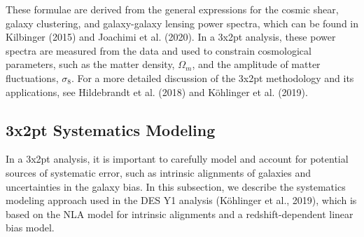 \documentclass[twocolumn]{aastex631}
\begin{document}
These formulae are derived from the general expressions for the cosmic shear, galaxy clustering, and galaxy-galaxy lensing power spectra, which can be found in Kilbinger (2015) and Joachimi et al. (2020). In a 3x2pt analysis, these power spectra are measured from the data and used to constrain cosmological parameters, such as the matter density, $\Omega_m$, and the amplitude of matter fluctuations, $\sigma_8$. For a more detailed discussion of the 3x2pt methodology and its applications, see Hildebrandt et al. (2018) and Köhlinger et al. (2019).

%
%

\subsection{3x2pt Systematics Modeling}

In a 3x2pt analysis, it is important to carefully model and account for potential sources of systematic error, such as intrinsic alignments of galaxies and uncertainties in the galaxy bias. In this subsection, we describe the systematics modeling approach used in the DES Y1 analysis (Köhlinger et al., 2019), which is based on the NLA model for intrinsic alignments and a redshift-dependent linear bias model.
\end{document}
